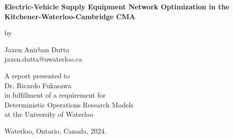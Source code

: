 \pagestyle{empty}

\begin{titlepage}
        \begin{center}
        \vspace*{0.5cm}

        \Huge
        {
        \bf 
        Electric-Vehicle Supply Equipment Network Optimization in the Kitchener-Waterloo-Cambridge CMA
        }

        \vspace*{4cm}

        \normalsize
        by \\

        \vspace*{1.0cm}

        \Large
        Jaxen Anirban Dutta \\
        \normalsize
        jaxen.dutta@uwaterloo.ca \\

        \vspace*{2.5cm}

        A report presented to \\
        Dr. Ricardo Fukasawa \\ 
        in fulfillment of a requirement for \\
        Deterministic Operations Research Models \\
        at the University of Waterloo \\

        \vspace*{1.25cm}

        Waterloo, Ontario, Canada, 2024. \\
        
        \end{center}
\end{titlepage}

\pagestyle{plain}
\setcounter{page}{2}

\cleardoublepage %

